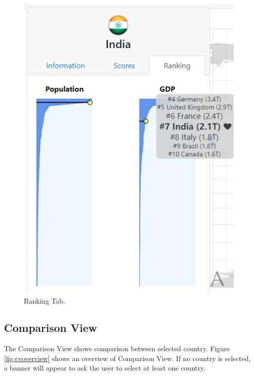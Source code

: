 \documentclass[12pt, fullpage,letterpaper]{article}
\begin{document}
\begin{figure}[h!]
\begin{minipage}{0.31\linewidth}
        \includegraphics[width=\textwidth]{figs/info3.jpg}
        \caption{Ranking Tab.}
        \label{fig:info3}
    \end{minipage}
\end{figure} 

\subsection{Comparison View}
The Comparison View shows comparison between selected country. Figure \ref{fig:cvoverview} shows an overview of Comparison View. If no country is selected,
a banner will appear to ask the user to select at least one country.
\end{document}
